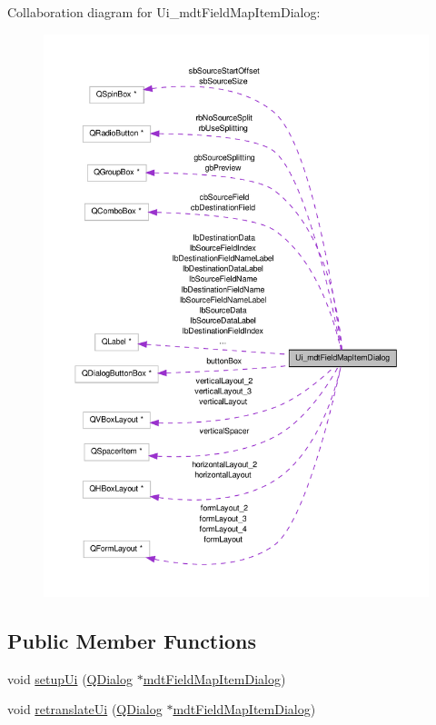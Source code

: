 Collaboration diagram for Ui\-\_\-mdt\-Field\-Map\-Item\-Dialog\-:\nopagebreak
\begin{figure}[H]
\begin{center}
\leavevmode
\includegraphics[width=350pt]{class_ui__mdt_field_map_item_dialog__coll__graph}
\end{center}
\end{figure}
\subsection*{Public Member Functions}
\begin{DoxyCompactItemize}
\item 
void \hyperlink{class_ui__mdt_field_map_item_dialog_a4a5a2d0d5245eeb5137a8cbd82b6eb08}{setup\-Ui} (\hyperlink{class_q_dialog}{Q\-Dialog} $\ast$\hyperlink{classmdt_field_map_item_dialog}{mdt\-Field\-Map\-Item\-Dialog})
\item 
void \hyperlink{class_ui__mdt_field_map_item_dialog_a796164b7675186294e0880b78d6a4a3f}{retranslate\-Ui} (\hyperlink{class_q_dialog}{Q\-Dialog} $\ast$\hyperlink{classmdt_field_map_item_dialog}{mdt\-Field\-Map\-Item\-Dialog})
\end{DoxyCompactItemize}

